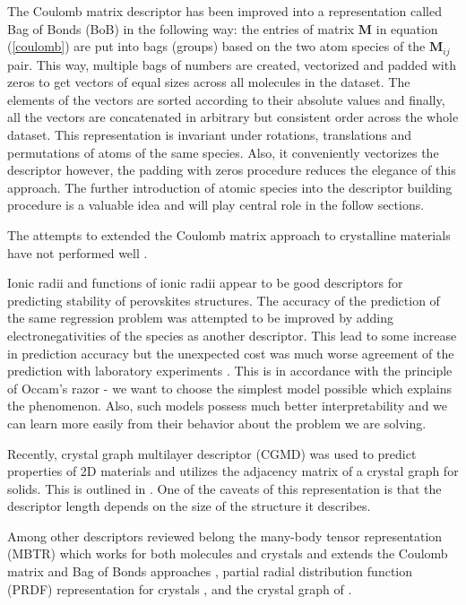 \documentclass[11pt,oneside,czech,american]{book} %
\theoremstyle{plain}
\theoremstyle{definition}
\begin{document}
The Coulomb matrix descriptor has been improved into a representation called Bag of Bonds (BoB) \parencite{hansen15} in the following way: the entries of matrix $\bm{M}$ in equation (\ref{coulomb}) are put into bags (groups) based on the two atom species of the $\bm{M}_{ij}$ pair. This way, multiple bags of numbers are created, vectorized and padded with zeros to get vectors of equal sizes across all molecules in the dataset. The elements of the vectors are sorted according to their absolute values and finally, all the vectors are concatenated in arbitrary but consistent order across the whole dataset. This representation is invariant under rotations, translations and permutations of atoms of the same species. Also, it conveniently vectorizes the descriptor however, the padding with zeros procedure reduces the elegance of this approach. The further introduction of atomic species into the descriptor building procedure is a valuable idea and will play central role in the follow sections.

The attempts to extended the Coulomb matrix approach to crystalline materials have not performed well \parencite{faber15}. 

Ionic radii and functions of ionic radii appear to be good descriptors for predicting stability of perovskites structures. The accuracy of the prediction of the same regression problem was attempted to be improved by adding electronegativities of the species as another descriptor. This lead to some increase in prediction accuracy but the unexpected cost was much worse agreement of the prediction with laboratory experiments \parencite{li19}. This is in accordance with the principle of Occam's razor - we want to choose the simplest model possible which explains the phenomenon. Also, such models possess much better interpretability and we can learn more easily from their behavior about the problem we are solving.

Recently, crystal graph multilayer descriptor (CGMD) was used to predict properties of 2D materials \parencite{lu20} and utilizes the adjacency matrix of a crystal graph for solids. This is outlined in \parencite{xie18}. One of the caveats of this representation is that the descriptor length depends on the size of the structure it describes.

Among other descriptors reviewed belong the many-body tensor representation (MBTR) which works for both molecules and crystals and extends the Coulomb matrix and Bag of Bonds approaches \parencite{huo17}, partial radial distribution function (PRDF) representation for crystals \parencite{schutt14}, and the crystal graph of \parencite{xie18}.
\end{document}
